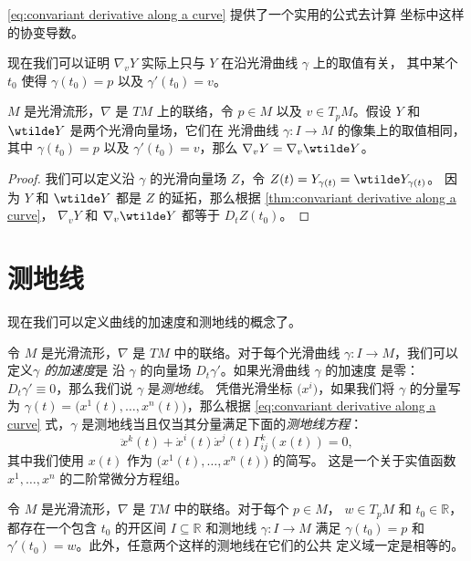 \eqref{eq:convariant derivative along a curve} 提供了一个实用的公式去计算
坐标中这样的协变导数。

现在我们可以证明 $\nabla_vY$ 实际上只与 $Y$ 在沿光滑曲线 $\gamma$ 上的取值有关，
其中某个 $t_0$ 使得 $\gamma(t_0)=p$ 以及 $\gamma'(t_0)=v$。

\begin{proposition}
  $M$ 是光滑流形，$\nabla$ 是 $TM$ 上的联络，令 $p\in M$ 以及 
  $v\in T_pM$。假设 $Y$ 和 $\wtilde Y$ 是两个光滑向量场，它们在
  光滑曲线 $\gamma:I\to M$ 的像集上的取值相同，其中
  $\gamma(t_0)=p$ 以及 $\gamma'(t_0)=v$，那么 $\nabla_vY=\nabla_v\wtilde Y$。
\end{proposition}
\begin{proof}
  我们可以定义沿 $\gamma$ 的光滑向量场 $Z$，令 $Z(t)=Y_{\gamma(t)}=\wtilde Y_{\gamma(t)}$。
  因为 $Y$ 和 $\wtilde Y$ 都是 $Z$ 的延拓，那么根据
  \autoref{thm:convariant derivative along a curve}，
  $\nabla_vY$ 和 $\nabla_v\wtilde Y$ 都等于 $D_tZ(t_0)$。
\end{proof}

\section{测地线}

现在我们可以定义曲线的加速度和测地线的概念了。

令 $M$ 是光滑流形，$\nabla$ 是 $TM$ 中的联络。对于每个光滑曲线
$\gamma:I\to M$，我们可以定义\emph{$\gamma$ 的加速度}是
沿 $\gamma$ 的向量场 $D_t\gamma'$。如果光滑曲线 $\gamma$ 的加速度
是零：$D_t\gamma'\equiv 0$，那么我们说 $\gamma$ 是\emph{测地线}。
凭借光滑坐标 $\bigl(x^i\bigr)$，如果我们将 $\gamma$ 的分量写为
$\gamma(t)=\bigl(x^1(t),\dots,x^n(t)\bigr)$，那么根据 \eqref{eq:convariant derivative along a curve}
式，$\gamma$ 是测地线当且仅当其分量满足下面的\emph{测地线方程}：
\begin{equation}\label{eq:geodesic curve equation}
  \ddot{x}^k(t)+\dot x^i(t)\dot x^j(t)\Gamma_{ij}^k(x(t))=0,
\end{equation}
其中我们使用 $x(t)$ 作为 $\bigl(x^1(t),\dots,x^n(t)\bigr)$ 的简写。
这是一个关于实值函数 $x^1,\dots,x^n$ 的二阶常微分方程组。

\begin{theorem}[测地线的存在唯一性]
  令 $M$ 是光滑流形，$\nabla$ 是 $TM$ 中的联络。对于每个 $p\in M$，
  $w\in T_pM$ 和 $t_0\in \mathbb{R}$，都存在一个包含 $t_0$
  的开区间 $I\subseteq \mathbb{R}$ 和测地线 $\gamma:I\to M$ 满足
  $\gamma(t_0)=p$ 和 $\gamma'(t_0)=w$。此外，任意两个这样的测地线在它们的公共
  定义域一定是相等的。
\end{theorem}


